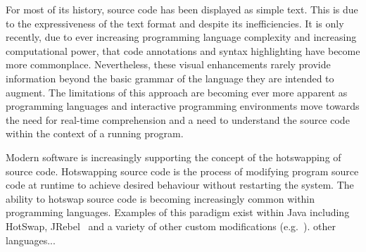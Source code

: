 



For most of its history, source code has been displayed as simple text. This is due to the expressiveness of the text format and despite its inefficiencies. It is only recently, due to ever increasing programming language complexity and increasing computational power, that code annotations and syntax highlighting have become more commonplace. Nevertheless, these visual enhancements rarely provide information beyond the basic grammar of the language they are intended to augment. The limitations of this approach are becoming ever more apparent as programming languages and interactive programming environments move towards the need for real-time comprehension and a need to understand the source code within the context of a running program.


Modern software is increasingly supporting the concept of the hotswapping of source code. Hotswapping source code is the process of modifying program source code at runtime to achieve desired behaviour without restarting the system. The ability to hotswap source code is becoming increasingly common within programming languages. Examples of this paradigm exist within Java including HotSwap, JRebel~\cite{ZeroTurnaround2014} and a variety of other custom modifications (e.g.~\cite{Thomas2011}). {\color{red} other languages...}

